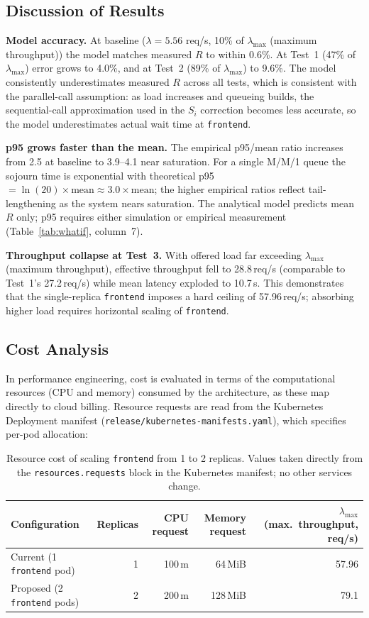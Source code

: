\documentclass[12pt]{article}
\begin{document}
\subsection{Discussion of Results}

\textbf{Model accuracy.} At baseline ($\lambda=5.56$ req/s, 10\% of $\lambda_{\max}$ (maximum throughput)) the model matches measured $R$ to within 0.6\%. At Test~1 (47\% of $\lambda_{\max}$) error grows to 4.0\%, and at Test~2 (89\% of $\lambda_{\max}$) to 9.6\%. The model consistently underestimates measured $R$ across all tests, which is consistent with the parallel-call assumption: as load increases and queueing builds, the sequential-call approximation used in the $S_i$ correction becomes less accurate, so the model underestimates actual wait time at \texttt{frontend}.

\textbf{p95 grows faster than the mean.} The empirical p95/mean ratio increases from 2.5 at baseline to 3.9--4.1 near saturation. For a single M/M/1 queue the sojourn time is exponential with theoretical p95 $= \ln(20) \times \text{mean} \approx 3.0 \times \text{mean}$; the higher empirical ratios reflect tail-lengthening as the system nears saturation. The analytical model predicts mean $R$ only; p95 requires either simulation or empirical measurement (Table~\ref{tab:whatif}, column~7).

\textbf{Throughput collapse at Test~3.} With offered load far exceeding $\lambda_{\max}$ (maximum throughput), effective throughput fell to 28.8\,req/s (comparable to Test~1's 27.2\,req/s) while mean latency exploded to 10.7\,s. This demonstrates that the single-replica \texttt{frontend} imposes a hard ceiling of 57.96\,req/s; absorbing higher load requires horizontal scaling of \texttt{frontend}.

\subsection{Cost Analysis}

In performance engineering, cost is evaluated in terms of the computational resources (CPU and memory) consumed by the architecture, as these map directly to cloud billing. Resource requests are read from the Kubernetes Deployment manifest (\texttt{release/kubernetes-manifests.yaml}), which specifies per-pod allocation:

\begin{table}[H]
  \centering
  \begin{tabular}{lrrrr}
    \toprule
    Configuration & Replicas & CPU request & Memory request & $\lambda_{\max}$ (max.\ throughput, req/s) \\
    \midrule
    Current (1 \texttt{frontend} pod)  & 1 & 100\,m & 64\,MiB & 57.96 \\
    Proposed (2 \texttt{frontend} pods) & 2 & 200\,m & 128\,MiB & 79.1 \\
    \bottomrule
  \end{tabular}
  \caption{Resource cost of scaling \texttt{frontend} from 1 to 2 replicas. Values taken directly from the \texttt{resources.requests} block in the Kubernetes manifest; no other services change.}
  \label{tab:cost}
\end{table}
\end{document}

